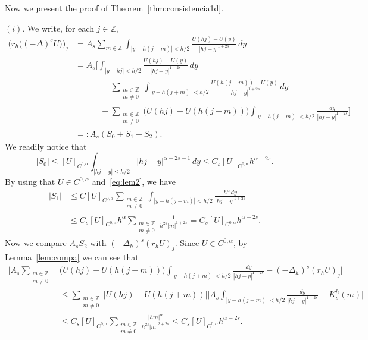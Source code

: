 \documentclass[a4paper,11pt,reqno]{amsart}
\newcommand{\Z}{\mathbb{Z}}
\theoremstyle{definition}
\numberwithin{equation}{section}
\begin{document}
Now we present the proof of Theorem~\ref{thm:consistencia1d}.

\noindent$(i)$. We write, for each $j\in \Z$,
\begin{align*}
\big(r_h\big((-\Delta)^sU\big)\big)_j
&= A_{s}\sum_{m\in \Z}\int_{|y-h(j+m)|< h/2} \frac{U(hj)-U(y)}{|hj-y|^{1+2s}}\,dy\\
&= A_{s}\bigg[\int_{|y-hj|< h/2} \frac{U(hj)-U(y)}{|hj-y|^{1+2s}}\,dy\\
&\qquad\quad+\sum_{\substack{m\in \Z\\ m\neq 0}}\int_{|y-h(j+m)|< h/2} \frac{U(h(j+m))-U(y)}{|hj-y|^{1+2s}}\,dy\\
&\qquad\quad + \sum_{\substack{m\in \Z\\ m\neq 0}} \big(U(hj)-U(h(j+m))\big)
\int_{|y-h(j+m)|< h/2} \frac{dy}{|hj-y|^{1+2s}}\bigg]\\
& =: A_s(S_0+S_1+S_2).
\end{align*}
We readily notice that
\[
|S_0|\le [U]_{C^{0,\alpha}} \int_{|hj-y|\le h/2}|hj-y|^{\alpha-2s-1}\,dy
\le C_s[U]_{C^{0,\alpha}}h^{\alpha-2s}.
\]
By using that $U\in C^{0,\alpha}$ and~\eqref{eq:lem2}, we have
\begin{align*}
|S_1| &\le C[U]_{C^{0,\alpha}} \sum_{\substack{m\in \Z\\ m\neq 0}}
\int_{|y-h(j+m)|< h/2} \frac{h^{\alpha}\,dy}{|hj-y|^{1+2s}} \\
&\le C_s[U]_{C^{0,\alpha}}h^{\alpha}\sum_{\substack{m\in \Z\\ m\neq 0}} \frac{1}{h^{2s}|m|^{1+2s}}
= C_s[U]_{C^{0,\alpha}}h^{\alpha-2s}.
\end{align*}
Now we compare $A_sS_2$ with $(-\Delta_h)^s(r_hU)_j$.
Since $U\in C^{0,\alpha}$, by Lemma~\ref{lem:compa} we can see that
\begin{align*}
\bigg|A_s\sum_{\substack{m\in \Z\\ m\neq 0}}
&\big(U(hj)-U(h(j+m))\big)\int_{|y-h(j+m)|< h/2}
\frac{dy}{|hj-y|^{1+2s}}-(-\Delta_h)^s(r_hU)_j\bigg|\\
&\le \sum_{\substack{m\in \Z\\m\neq 0}}
\big|U(hj)-U(h(j+m))\big| \bigg|A_s\int_{|y-h(j+m)|< h/2} \frac{dy}{|hj-y|^{1+2s}}-K^h_s(m) \bigg| \\
&\le C_s[U]_{C^{0,\alpha}}\sum_{\substack{m\in \Z\\m\neq 0}} \frac{|hm|^{\alpha}}{h^{2s}|m|^{2+2s}}
\le C_s[U]_{C^{0,\alpha}}h^{\alpha-2s}.
\end{align*}
\end{document}

